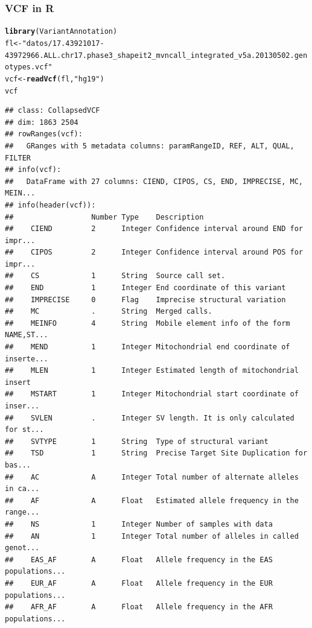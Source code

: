 \documentclass{beamer}\usepackage[]{graphicx}\usepackage[]{color}
\makeatletter
\newcommand{\hlstr}[1]{\textcolor[rgb]{0.192,0.494,0.8}{#1}}%
\newcommand{\hlstd}[1]{\textcolor[rgb]{0.345,0.345,0.345}{#1}}%
\newcommand{\hlkwb}[1]{\textcolor[rgb]{0.69,0.353,0.396}{#1}}%
\newcommand{\hlkwd}[1]{\textcolor[rgb]{0.737,0.353,0.396}{\textbf{#1}}}%
\newenvironment{kframe}{%
 \def\at@end@of@kframe{}%
 \ifinner\ifhmode%
  \def\at@end@of@kframe{\end{minipage}}%
  \begin{minipage}{\columnwidth}%
 \fi\fi%
 \def\FrameCommand##1{\hskip\@totalleftmargin \hskip-\fboxsep
 \colorbox{shadecolor}{##1}\hskip-\fboxsep
     \hskip-\linewidth \hskip-\@totalleftmargin \hskip\columnwidth}%
 \MakeFramed {\advance\hsize-\width
   \@totalleftmargin\z@ \linewidth\hsize
   \@setminipage}}%
 {\par\unskip\endMakeFramed%
 \at@end@of@kframe}
\newenvironment{knitrout}{}{} %
\makeatother
\begin{document}
\begin{frame}[fragile]
\frametitle{VCF in R}

\begin{knitrout}\footnotesize
{}\color{fgcolor}\begin{kframe}
\begin{alltt}
\hlkwd{library}\hlstd{(VariantAnnotation)}
\hlstd{fl}\hlkwb{<-}\hlstr{"datos/17.43921017-43972966.ALL.chr17.phase3_shapeit2_mvncall_integrated_v5a.20130502.genotypes.vcf"}
\hlstd{vcf} \hlkwb{<-} \hlkwd{readVcf}\hlstd{(fl,} \hlstr{"hg19"}\hlstd{)}
\hlstd{vcf}
\end{alltt}
\begin{verbatim}
## class: CollapsedVCF 
## dim: 1863 2504 
## rowRanges(vcf):
##   GRanges with 5 metadata columns: paramRangeID, REF, ALT, QUAL, FILTER
## info(vcf):
##   DataFrame with 27 columns: CIEND, CIPOS, CS, END, IMPRECISE, MC, MEIN...
## info(header(vcf)):
##                  Number Type    Description                               
##    CIEND         2      Integer Confidence interval around END for impr...
##    CIPOS         2      Integer Confidence interval around POS for impr...
##    CS            1      String  Source call set.                          
##    END           1      Integer End coordinate of this variant            
##    IMPRECISE     0      Flag    Imprecise structural variation            
##    MC            .      String  Merged calls.                             
##    MEINFO        4      String  Mobile element info of the form NAME,ST...
##    MEND          1      Integer Mitochondrial end coordinate of inserte...
##    MLEN          1      Integer Estimated length of mitochondrial insert  
##    MSTART        1      Integer Mitochondrial start coordinate of inser...
##    SVLEN         .      Integer SV length. It is only calculated for st...
##    SVTYPE        1      String  Type of structural variant                
##    TSD           1      String  Precise Target Site Duplication for bas...
##    AC            A      Integer Total number of alternate alleles in ca...
##    AF            A      Float   Estimated allele frequency in the range...
##    NS            1      Integer Number of samples with data               
##    AN            1      Integer Total number of alleles in called genot...
##    EAS_AF        A      Float   Allele frequency in the EAS populations...
##    EUR_AF        A      Float   Allele frequency in the EUR populations...
##    AFR_AF        A      Float   Allele frequency in the AFR populations...

\end{verbatim}
\end{kframe}
\end{knitrout}
\end{frame}
\end{document}
